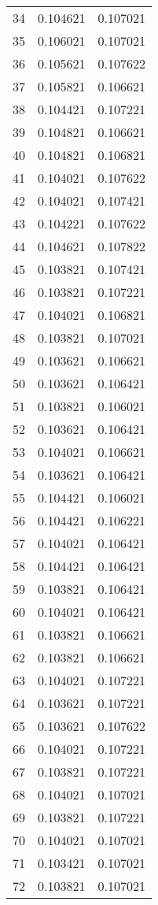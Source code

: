 \begin{longtable}{rrr}
34 & 0.104621 & 0.107021 \\
35 & 0.106021 & 0.107021 \\
36 & 0.105621 & 0.107622 \\
37 & 0.105821 & 0.106621 \\
38 & 0.104421 & 0.107221 \\
39 & 0.104821 & 0.106621 \\
40 & 0.104821 & 0.106821 \\
41 & 0.104021 & 0.107622 \\
42 & 0.104021 & 0.107421 \\
43 & 0.104221 & 0.107622 \\
44 & 0.104621 & 0.107822 \\
45 & 0.103821 & 0.107421 \\
46 & 0.103821 & 0.107221 \\
47 & 0.104021 & 0.106821 \\
48 & 0.103821 & 0.107021 \\
49 & 0.103621 & 0.106621 \\
50 & 0.103621 & 0.106421 \\
51 & 0.103821 & 0.106021 \\
52 & 0.103621 & 0.106421 \\
53 & 0.104021 & 0.106621 \\
54 & 0.103621 & 0.106421 \\
55 & 0.104421 & 0.106021 \\
56 & 0.104421 & 0.106221 \\
57 & 0.104021 & 0.106421 \\
58 & 0.104421 & 0.106421 \\
59 & 0.103821 & 0.106421 \\
60 & 0.104021 & 0.106421 \\
61 & 0.103821 & 0.106621 \\
62 & 0.103821 & 0.106621 \\
63 & 0.104021 & 0.107221 \\
64 & 0.103621 & 0.107221 \\
65 & 0.103621 & 0.107622 \\
66 & 0.104021 & 0.107221 \\
67 & 0.103821 & 0.107221 \\
68 & 0.104021 & 0.107021 \\
69 & 0.103821 & 0.107221 \\
70 & 0.104021 & 0.107021 \\
71 & 0.103421 & 0.107021 \\
72 & 0.103821 & 0.107021 \\

\end{longtable}
